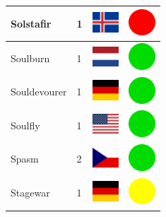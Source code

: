 \documentclass[12pt, a4paper, twoside]{report}
\begin{document}
\begin{center}
\begin{longtable}{|p{5cm}|p{2cm}|p{2cm}|p{2cm}|}
			Solstafir & 1 & \includegraphics[width=1cm]{4x3/is} & \includegraphics[width=1cm]{likes/n} \\ \hline
			Soulburn & 1 & \includegraphics[width=1cm]{4x3/nl} & \includegraphics[width=1cm]{likes/y} \\ \hline
			Souldevourer & 1 & \includegraphics[width=1cm]{4x3/de} & \includegraphics[width=1cm]{likes/y} \\ \hline
			Soulfly & 1 & \includegraphics[width=1cm]{4x3/us} & \includegraphics[width=1cm]{likes/y} \\ \hline
			Spasm & 2 & \includegraphics[width=1cm]{4x3/cz} & \includegraphics[width=1cm]{likes/y} \\ \hline
			Stagewar & 1 & \includegraphics[width=1cm]{4x3/de} & \includegraphics[width=1cm]{likes/m} \\ \hline

\end{longtable}
\end{center}
\end{document}

